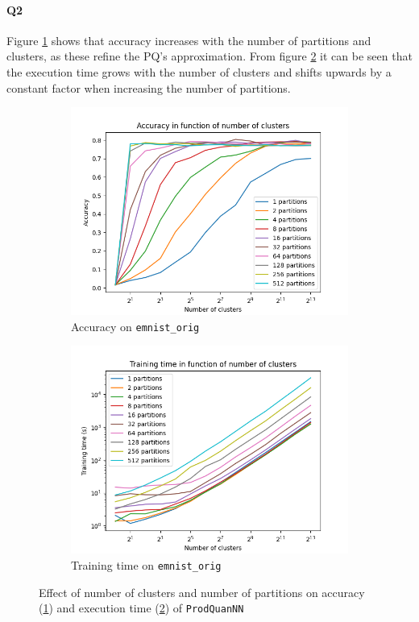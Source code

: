 \documentclass[10pt]{article}
\begin{document}
\paragraph{Q2} Figure \ref{fig:acc} shows that accuracy increases with the number of partitions and clusters, as these refine the PQ's approximation.
From figure \ref{fig:exec} it can be seen that the execution time grows with the number of clusters and shifts upwards by a constant factor when increasing the number of partitions. 
\vspace{-.4cm}
\begin{figure}[h]
	\begin{subfigure}{.5\textwidth}
		\includegraphics[width=\linewidth]{../results/plots/emnist_orig-acc-2.png}
		\caption{Accuracy on \texttt{emnist\_orig}}
		\label{fig:acc}
	\end{subfigure}%
	\hfill
	\begin{subfigure}{.5\textwidth}
		\includegraphics[width=\linewidth]{../results/plots/emnist_orig-exec-2.png}
		\caption{Training time on \texttt{emnist\_orig}}
		\label{fig:exec}
	\end{subfigure}
	\vspace{-.3cm}
	\caption{Effect of number of clusters and number of partitions on accuracy (\ref{fig:acc}) and execution time (\ref{fig:exec}) of \texttt{ProdQuanNN}}
	\label{fig:hyperparams}
\end{figure}
\end{document}
